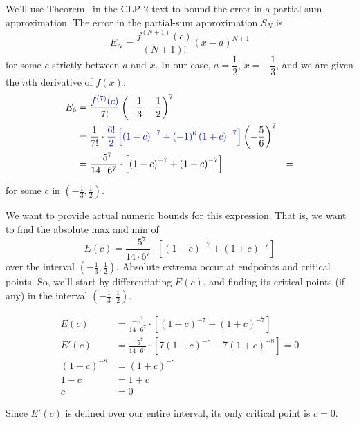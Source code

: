 \begin{solution}
	We'll use  Theorem~ in the CLP-2 text to bound the error in a partial-sum approximation. The error in the partial-sum approximation $S_N$ is
\[E_N=\frac{f^{(N+1)}(c)}{(N+1)!}(x-a)^{N+1}\]
for some $c$ strictly between $a$ and $x$. In our case, $a=\dfrac12$, $x=-\dfrac1{3}$, and we are given the $n$th derivative of $f(x)$:
\begin{align*}E_6&=\frac{\textcolor{blue}{f^{(7)}(c)}}{7!}\left(-\frac13-\frac12 \right)^{7}\\
&=\frac{1}{7!}\cdot\textcolor{blue}{\frac{6!}{2}\left[\left(1-c\right)^{-7}+(-1)^{6}\left(1+c\right)^{-7} \right]}\left(-\frac56 \right)^7\\
&=\frac{-5^7}{14\cdot 6^7}\cdot\left[\left(1-c\right)^{-7}+\left(1+c\right)^{-7} \right]
&=\end{align*}


for some $c$ in $(-\frac13,\frac1{2})$.

We want to provide actual numeric bounds for this expression. That is, we want to find the absolute max and min of
\[E(c)=\frac{-5^7}{14\cdot 6^7}\cdot\left[\left(1-c\right)^{-7}+\left(1+c\right)^{-7} \right]\]
over the interval $\left( -\frac{1}{3},\frac{1}{2}\right)$. Absolute extrema occur at endpoints and critical points. So, we'll start by differentiating $E(c)$, and finding its critical points (if any) in  the interval $\left( -\frac{1}{3},\frac{1}{2}\right)$.

\begin{align*}
E(c)&=\frac{-5^7}{14\cdot 6^7}\cdot\left[\left(1-c\right)^{-7}+\left(1+c\right)^{-7} \right]\\
E'(c)&=\frac{-5^7}{14\cdot 6^7}\cdot\left[7\left(1-c\right)^{-8}-7\left(1+c\right)^{-8} \right]=0\\
\left(1-c\right)^{-8}&=\left(1+c\right)^{-8}\\
1-c&=1+c\\
c&=0
\end{align*}

Since $E'(c)$ is defined over our entire interval, its only critical point is $c=0$.


\end{solution}
